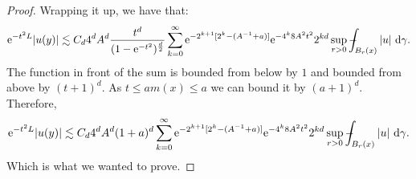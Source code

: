 \documentclass[a4paper,oneside,10pt]{amsproc}
\theoremstyle{plain}
\theoremstyle{remark}
\theoremstyle{definition}
\newcommand{\D}{\,\textup{d}}
\def\Xint#1{\mathchoice
  {\XXint\displaystyle\textstyle{#1}}%
  {\XXint\textstyle\scriptstyle{#1}}%
  {\XXint\scriptstyle\scriptscriptstyle{#1}}%
  {\XXint\scriptscriptstyle\scriptscriptstyle{#1}}%
  \!\int}
\def\XXint#1#2#3{{\setbox0=\hbox{$#1{#2#3}{\int}$ }
    \vcenter{\hbox{$#2#3$ }}\kern-.535\wd0}}
\def\dashint{\Xint-}
\renewcommand{\leq}{\leqslant}
\renewcommand{\leq}{\leqslant}
\newcommand{\e}{\mathrm{e}} %
\renewcommand{\leq}{\leqslant}%
\begin{document}
\begin{proof}
  
  Wrapping it up, we have that:
  \begin{equation*}
    \e^{-t^2 L} |u(y)| \lesssim C_d 4^d A^d \frac{t^d}{(1 -
      \e^{-t^2})^{\frac{d}2}} \sum_{k = 0}^\infty \e^{-2^{k+1} [2^k
      -(A^{-1} + a)]} \e^{-4^k 8 A^2 t^2} 2^{kd} \sup_{r > 0}
    \dashint_{B_r(x)} |u| \, \D\gamma.
  \end{equation*}
  The function in front of the sum is bounded from below by $1$ and
  bounded from above by $(t + 1)^d$. As $t \leq a m(x) \leq a$ we can
  bound it by $(a + 1)^d$. Therefore,
  \begin{equation*}
    \e^{-t^2 L} |u(y)| \lesssim C_d 4^d A^d (1 + a)^d \sum_{k = 0}^\infty \e^{-2^{k+1} [2^k
      -(A^{-1} + a)]} \e^{-4^k 8 A^2 t^2} 2^{kd} \sup_{r > 0}
    \dashint_{B_r(x)} |u| \, \D\gamma.
  \end{equation*}
  Which is what we wanted to prove.
\end{proof}


\printbibliography
\end{document}
